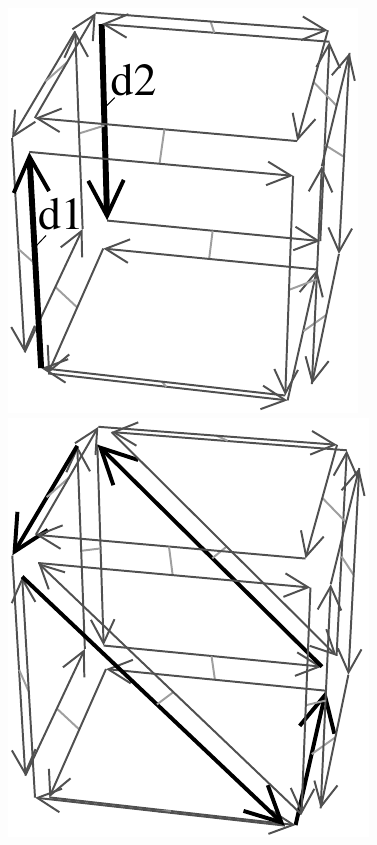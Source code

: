 %
\def\largFig{.25\textwidth}%
\begin{figure}
  \begin{ccTexOnly}
    \begin{center}
      \includegraphics[width=\largFig]{Combinatorial_map/fig/pdf/ope1}\qquad
      \includegraphics[width=\largFig]{Combinatorial_map/fig/pdf/ope2}\qquad

\end{center}
\end{ccTexOnly}
\end{figure}
